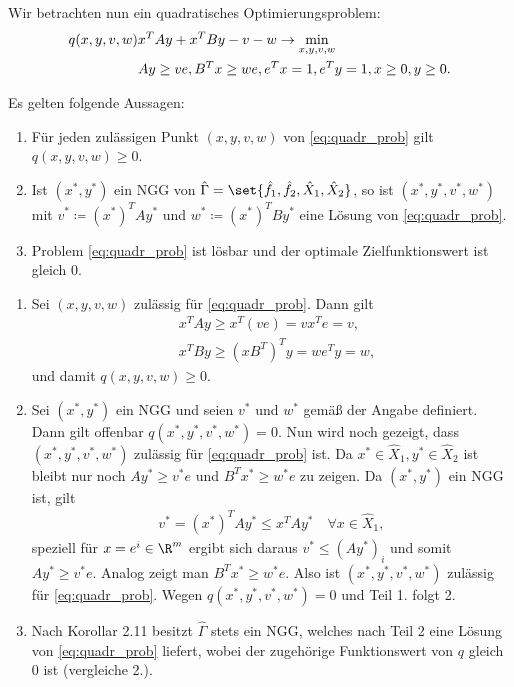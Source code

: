 Wir betrachten nun ein quadratisches Optimierungsproblem:
\begin{align}\label{eq:quadr_prob}
q(x, y, v, w)&  x^{T}Ay + x^{T}By - v-w \to \min_{x, y, v, w}\\
&Ay \geq ve, B^{T}x \geq we, e^{T}x = 1, e^{T}y = 1, x\geq 0, y\geq 0. \notag
\end{align}
\begin{satz}
  Es gelten folgende Aussagen:
  \begin{enumerate}
  \item Für jeden zulässigen Punkt $(x, y, v, w)$ von \eqref{eq:quadr_prob} gilt $q(x, y, v, w)\geq 0$. 
  \item Ist $(x^{*}, y^{*})$ ein NGG von $\hat \Gamma = \set{\hat f_{1}, \hat f_{2}, \hat X_{1}, \hat X_{2}}$, so ist $(x^{*}, y^{*}, v^{*}, w^{*})$ mit $v^{*}\coloneqq (x^{*})^{T}Ay^{*}$ und $w^{*} \coloneqq (x^{*})^{T}By^{*}$ eine Lösung von \eqref{eq:quadr_prob}.
\item Problem \eqref{eq:quadr_prob} ist lösbar und der optimale Zielfunktionswert ist gleich $0$. 
  \end{enumerate}
\end{satz}
\begin{beweis}
  \begin{enumerate}
  \item  Sei $(x, y, v, w)$ zulässig für \eqref{eq:quadr_prob}. Dann gilt
  \begin{align*}
&    x^{T}Ay \geq x^{T}(ve) = vx^{T}e = v, \\
&    x^{T}By \geq (xB^{T})^{T}y = we^{T}y = w, 
  \end{align*}
und damit $q(x, y, v, w)\geq 0$. 
\item Sei $(x^{*}, y^{*})$ ein NGG und seien $v^{*}$ und $w^{*}$ gemäß der Angabe definiert. Dann gilt offenbar $q(x^{*}, y^{*}, v^{*}, w^{*}) = 0$. Nun wird noch gezeigt, dass $(x^{*}, y^{*}, v^{*}, w^{*})$ zulässig für \eqref{eq:quadr_prob} ist. Da $x^{*} \in \hat X_{1}, y^{*} \in \hat X_{2}$ ist bleibt nur noch $Ay^{*} \geq v^{*}e$ und $B^{T}x^{*} \geq w^{*}e$ zu zeigen. Da  $(x^{*}, y^{*})$ ein NGG ist, gilt
  \begin{align*}
v^{*}= (x^{*})^{T}Ay^{*} \leq x^{T}Ay^{*} \quad \forall x \in \hat X_{1}, 
  \end{align*}
speziell für $x = e^{i} \in \R^{m}$ ergibt sich daraus $v^{*}\leq (Ay^{*})_{i}$ und somit $Ay^*\geq v^{*}e$. Analog zeigt man $B^{T}x^{*} \geq w^{*}e$. Also ist $(x^{*}, y^{*}, v^{*}, w^{*})$ zulässig für \eqref{eq:quadr_prob}. Wegen $q (x^{*}, y^{*}, v^{*}, w^{*}) = 0$ und Teil 1. folgt 2.
\item Nach Korollar 2.11 besitzt $\hat\Gamma$ stets ein NGG, welches nach Teil 2 eine Lösung von \eqref{eq:quadr_prob} liefert, wobei der zugehörige Funktionswert von $q$ gleich $0$ ist (vergleiche 2.).
  \end{enumerate}
\end{beweis}

